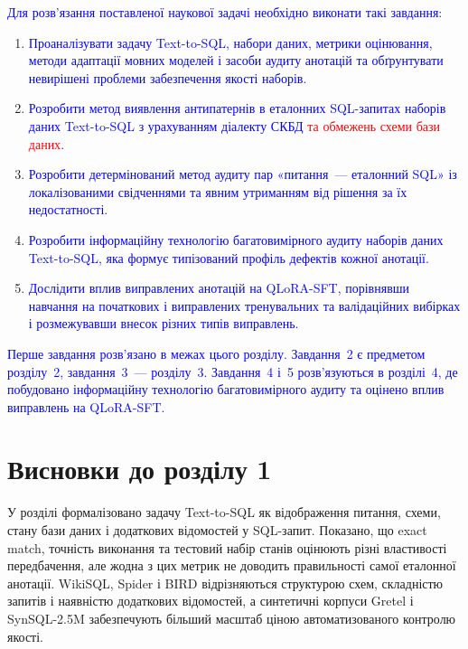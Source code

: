 \documentclass[a4paper,14pt,oneside]{extreport}
\begin{document}
\textcolor{blue}{Для розв'язання поставленої наукової задачі необхідно виконати такі завдання:}

\begin{enumerate}
\item \textcolor{blue}{Проаналізувати задачу Text-to-SQL, набори даних, метрики оцінювання, методи адаптації мовних моделей і засоби аудиту анотацій та обґрунтувати невирішені проблеми забезпечення якості наборів.}

\item \textcolor{blue}{Розробити метод виявлення антипатернів в еталонних SQL-запитах наборів даних Text-to-SQL з урахуванням діалекту СКБД} \textcolor{red}{та обмежень схеми бази даних}\textcolor{blue}{.}

\item \textcolor{blue}{Розробити детермінований метод аудиту пар «питання~--- еталонний SQL» із локалізованими свідченнями та явним утриманням від рішення за їх недостатності.}

\item \textcolor{blue}{Розробити інформаційну технологію багатовимірного аудиту наборів даних Text-to-SQL, яка формує типізований профіль дефектів кожної анотації.}

\item \textcolor{blue}{Дослідити вплив виправлених анотацій на QLoRA-SFT, порівнявши навчання на початкових і виправлених тренувальних та валідаційних вибірках і розмежувавши внесок різних типів виправлень.}
\end{enumerate}

\textcolor{blue}{Перше завдання розв'язано в межах цього розділу. Завдання~2 є предметом розділу~2, завдання~3~--- розділу~3. Завдання~4 і~5 розв'язуються в розділі~4, де побудовано інформаційну технологію багатовимірного аудиту та оцінено вплив виправлень на QLoRA-SFT.}

\section*{Висновки до розділу 1}

У розділі формалізовано задачу Text-to-SQL як відображення питання, схеми, стану бази даних і додаткових відомостей у SQL-запит. Показано, що exact match, точність виконання та тестовий набір станів оцінюють різні властивості передбачення, але жодна з цих метрик не доводить правильності самої еталонної анотації. WikiSQL, Spider і BIRD відрізняються структурою схем, складністю запитів і наявністю додаткових відомостей, а синтетичні корпуси Gretel і SynSQL-2.5M забезпечують більший масштаб ціною автоматизованого контролю якості.
\end{document}
